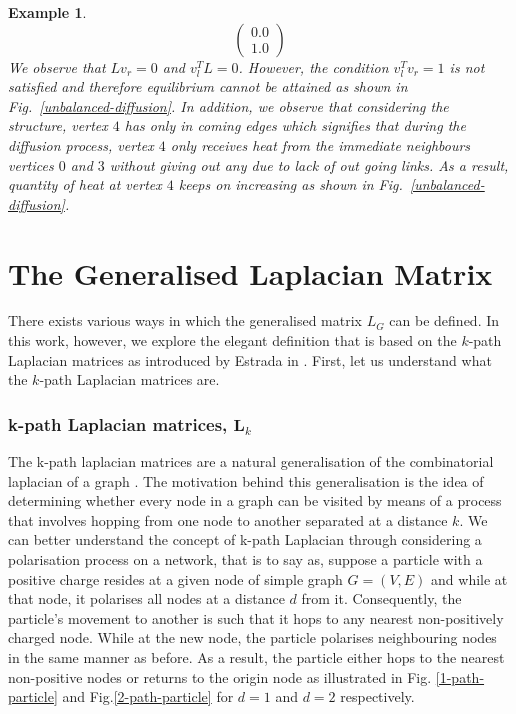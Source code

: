\documentclass[10pt,a4paper]{article}
\newtheorem{exa}{Example}
\begin{document}
\begin{exa}
\begin{equation*}
\begin{pmatrix}
   0.0 \\
   1.0
   \end{pmatrix}
   \end{equation*}
   We observe that $Lv_r = 0$ and $v_l^TL = 0$. However, the condition $v_l^T v_r = 1$  is not satisfied and therefore equilibrium cannot be attained as shown in Fig.~\ref{unbalanced-diffusion}. In addition, we observe that considering the structure, vertex $4$ has only in coming edges which signifies that during the diffusion process, vertex $4$ only receives heat from the immediate neighbours vertices $0$ and $3$ without giving out any due to lack of out going links. As a result, quantity of heat at vertex $4$ keeps on increasing as shown in Fig.~\ref{unbalanced-diffusion}.
   \end{exa}	
    \section{The Generalised Laplacian Matrix}
    	    
    	    
    	    
    	  
    	    There exists various ways in which the generalised matrix $L_G$ can be defined. In this work, however, we explore the elegant definition that is based on the $k$-path Laplacian matrices as introduced by Estrada in \citep{estrada2012path}. First, let us understand what the $k$-path Laplacian matrices are.
    	    \subsubsection{ k-path Laplacian matrices, $\mathbf{L}_k$}
    	    The k-path laplacian matrices are a natural generalisation of the combinatorial laplacian of a graph \citep{estrada2012path}. The motivation behind this generalisation is the idea of determining whether every node in a graph can be visited by means of a process that involves hopping from one node to another separated at a distance $k$. We can better understand the concept of k-path Laplacian through considering a polarisation process on a network, that is to say as, suppose a particle with a positive charge resides at a given node of simple graph $G= (V,E)$ and while at that node, it polarises all nodes at a distance $d$ from it. Consequently, the particle's movement to another is such that it hops to any nearest non-positively charged node. While at the new node, the particle polarises neighbouring nodes in the same manner as before. As a result, the particle either hops to the nearest non-positive nodes or returns to the origin node as illustrated in Fig. \ref{1-path-particle} and Fig.\ref{2-path-particle} for $d=1$ and $d=2$ respectively.
    	    
\end{document}
